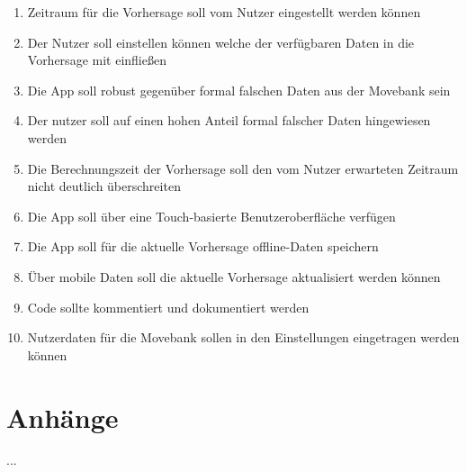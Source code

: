 \documentclass[12pt]{article} %
\begin{document}
\begin{enumerate}[(R1)]
		\item Zeitraum für die Vorhersage soll vom Nutzer eingestellt werden können
		\item Der Nutzer soll einstellen können welche der verfügbaren Daten in die Vorhersage mit einfließen
		\item Die App soll robust gegenüber formal falschen Daten aus der Movebank sein
		\item Der nutzer soll auf einen hohen Anteil formal falscher Daten hingewiesen werden
		\item Die Berechnungszeit der Vorhersage soll den vom Nutzer erwarteten Zeitraum nicht deutlich überschreiten
		\item Die App soll über eine Touch-basierte Benutzeroberfläche verfügen
		\item Die App soll für die aktuelle Vorhersage offline-Daten speichern
		\item Über mobile Daten soll die aktuelle Vorhersage aktualisiert werden können
		\item Code sollte kommentiert und dokumentiert werden
		\item Nutzerdaten für die Movebank sollen in den Einstellungen eingetragen werden können	
 	\end{enumerate}
	





\section{Anhänge}

...
\end{document}
